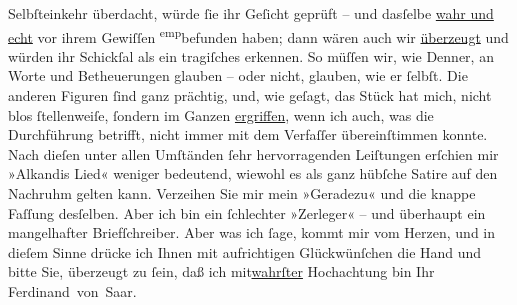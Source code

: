 \begin{ledgroupsized}[t]{13cm}
                    Selbſteinkehr überdacht, würde ſie ihr Geſicht geprüft – und dasſelbe \uline{wahr und echt} vor ihrem Gewiſſen \substVorne{}\textsuperscript{emp}\substDazwischen{}be\substHinten{}funden haben; dann wären auch wir \uline{überzeugt} und würden ihr Schickſal als ein tragiſches erkennen. So
                    müſſen wir, wie Denner, an
                    Worte und Betheuerungen glauben – oder nicht, glauben, wie er ſelbſt. Die
                    anderen Figuren ſind ganz prächtig, und, wie geſagt, das Stück hat mich, nicht blos ſtellenweiſe,
                    ſondern im Ganzen \uline{ergriffen}, wenn ich auch, was
                    die Durchführung betrifft, nicht immer mit dem Verfaſſer übereinſtimmen konnte.
                    Nach dieſen unter allen Umſtänden ſehr hervorragenden Leiſtungen erſchien mir
                        »Alkandis Lied« weniger bedeutend, wiewohl
                    es als ganz hübſche Satire auf den Nachruhm gelten kann.\pend
           \pstart
           Verzeihen Sie mir mein »Geradezu« und die knappe Faſſung desſelben. Aber ich bin
                        {\pb}ein ſchlechter »Zerleger« – und überhaupt
                    ein mangelhafter Briefſchreiber. Aber was ich ſage, kommt mir vom Herzen, und in
                    dieſem Sinne drücke ich Ihnen mit aufrichtigen Glückwünſchen die Hand und bitte
                    Sie, überzeugt zu ſein, daß ich \introOben{}mit\introOben{}{ }\uline{wahrſter} Hochachtung bin\pend
           \pstart Ihr \spacefill\mbox{Ferdinand von Saar.}\pend{}
         
         \endnumbering{}\end{ledgroupsized}  \newcommand{\dateiname}{L00296}\newcommand{\titel}{Ferdinand von Saar an Arthur Schnitzler, 5. 2. 1894}\newcommand{\editorInnen}{Martin Anton Müller und Gerd-Hermann Susen}
      